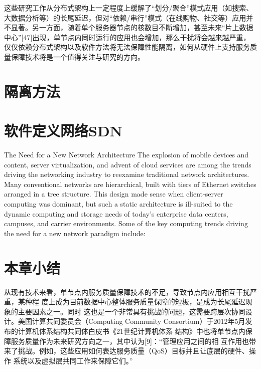 这些研究工作从分布式架构上一定程度上缓解了“划分/聚合”模式应用（如搜索、大数据分析等）的长尾延迟，但对“依赖/串行”模式（在线购物、社交等）应用并不显著。另一方面，随着单个服务器节点的核数目不断增加，甚至未来“片上数据中心”[47]出现，单节点内同时运行的应用也会增加，那么干扰将会越来越严重，仅仅依赖分布式架构以及软件方法将无法保障性能隔离，如何从硬件上支持服务质量保障技术将是一个值得关注与研究的方向。


\section{隔离方法}
\label{sec:multifig}

\section{软件定义网络SDN}
\label{sec:background:sdn}

The Need for a New Network Architecture %
The explosion of mobile devices and content, server virtualization, and
advent of cloud services are among the trends driving the networking
industry to reexamine traditional network architectures. Many conventional
networks are hierarchical, built with tiers of Ethernet switches arranged in
a tree structure. This design made sense when client-server computing
was dominant, but such a static architecture is ill-suited to the dynamic
computing and storage needs of today’s enterprise data centers,
campuses, and carrier environments. Some of the key computing trends
driving the need for a new network paradigm include:


\section{本章小结}

从现有技术来看，单节点内服务质量保障技术的不足，导致节点内应用相互干扰严重，某种程
度上成为目前数据中心整体服务质量保障的短板，是成为长尾延迟现象的主要因素之一。同时
这也是一个非常具有挑战的问题，这需要跨层次协同设计。美国计算共同委员会（Computing 
Community Consortium）于2012年5月发布的计算机体系结构共同体白皮书《21世纪计算机体系
结构》中也将单节点内保障服务质量作为未来研究方向之一，其中认为[9]：“管理应用之间的相
互作用也带来了挑战。例如，这些应用如何表达服务质量（QoS）目标并且让底层的硬件、操作
系统以及虚拟层共同工作来保障它们。”

